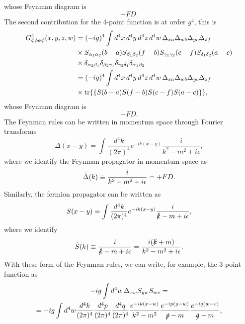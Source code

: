 whose Feynman diagram is 
\begin{equation}
    +FD.
\end{equation}
The second contribution for the 4-point function is at order $g^4$, this is 
\begin{equation}
    \begin{split}
        G^{4}_{\phi\phi\phi\phi}(x,y,z,w) &= (-ig)^4\int d^4x \,d^4y\,d^4z\,d^4w\,\Delta_{xa}\Delta_{wb}\Delta_{yc}\Delta_{zf} \\
        & \times S_{\alpha_1\alpha_2}(b - a)S_{\beta_1\beta_2}(f - b)S_{\gamma_1\gamma_2}(c - f)S_{\delta_1\delta_2}(a - c) \\
        &\times \delta_{\alpha_2\beta_1}\delta_{\beta_2\gamma_1}\delta_{\gamma_2\delta_1}\delta_{\alpha_1\beta_2} \\
        &= (-ig)^4\int d^4x \,d^4y\,d^4z\,d^4w\,\Delta_{xa}\Delta_{wb}\Delta_{yc}\Delta_{zf} \\
        & \times \tr{\{S(b - a)S(f - b)S(c - f)S(a - c)\}},
    \end{split} 
\end{equation}
whose Feynman diagram is 
\begin{equation}
    +FD.
\end{equation}
The Feynman rules can be written in momentum space through Fourier transforms 
\begin{equation}
    \Delta(x - y) = \int \frac{d^4k}{(2\pi)^4}e^{-ik(x - y)}\frac{i}{k^2 - m^2 + i\epsilon},
\end{equation}
where we identify the Feynman propagator in momentum space as 
\begin{equation}
    \t{\Delta}(k) \equiv \frac{i}{k^2 - m^2 + i\epsilon} = +FD.
\end{equation}
Similarly, the fermion propagator can be written as 
\begin{eqnarray}
    S(x - y) = \int\frac{d^4k}{(2\pi)^4}e^{-ik(x - y)}\frac{i}{\sl{k} - m + i\epsilon},
\end{eqnarray}
where we identify
\begin{equation}
    \t{S}(k) \equiv \frac{i}{\sl{k} - m + i\epsilon} = \frac{i(\sl{k} + m)}{k^2 - m^2 + i\epsilon}.
\end{equation}
With these form of the Feynman rules, we can write, for example, the 3-point function as 
\begin{multline}
        -ig\int d^4w\,\Delta_{xw}S_{yw}S_{wv} = \\ = -ig\int d^4w\frac{d^4k}{(2\pi)^4}\frac{d^4p}{(2\pi)^4}\frac{d^4q}{(2\pi)^4} \frac{e^{-ik(x - w)}}{k^2 - m^2}\frac{e^{-ip(y - w)}}{\sl{p} - m}\frac{e^{-iq(w  -v)}}{\sl{q} - m},
\end{multline}
